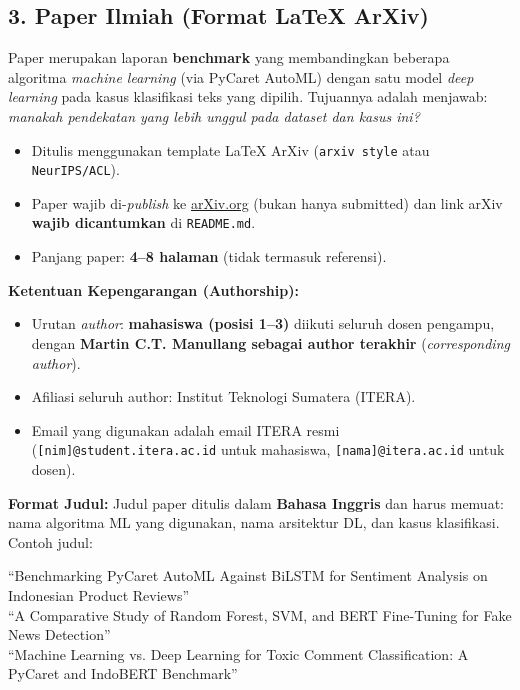 \documentclass[11pt,a4paper]{article}
\begin{document}
\subsection{3. Paper Ilmiah (Format LaTeX ArXiv)}

Paper merupakan laporan \textbf{benchmark} yang membandingkan beberapa algoritma \textit{machine learning} (via PyCaret AutoML) dengan satu model \textit{deep learning} pada kasus klasifikasi teks yang dipilih. Tujuannya adalah menjawab: \textit{manakah pendekatan yang lebih unggul pada dataset dan kasus ini?}

\begin{itemize}
  \item Ditulis menggunakan template LaTeX ArXiv (\texttt{arxiv style} atau \texttt{NeurIPS/ACL}).
  \item Paper wajib di-\textit{publish} ke \href{https://arxiv.org}{arXiv.org} (bukan hanya submitted) dan link arXiv \textbf{wajib dicantumkan} di \texttt{README.md}.
  \item Panjang paper: \textbf{4--8 halaman} (tidak termasuk referensi).
\end{itemize}

\textbf{Ketentuan Kepengarangan (Authorship):}
\begin{itemize}
  \item Urutan \textit{author}: \textbf{mahasiswa (posisi 1--3)} diikuti seluruh dosen pengampu, dengan \textbf{Martin C.T. Manullang sebagai author terakhir} (\textit{corresponding author}).
  \item Afiliasi seluruh author: Institut Teknologi Sumatera (ITERA).
  \item Email yang digunakan adalah email ITERA resmi (\texttt{[nim]@student.itera.ac.id} untuk mahasiswa, \texttt{[nama]@itera.ac.id} untuk dosen).
\end{itemize}

\textbf{Format Judul:} Judul paper ditulis dalam \textbf{Bahasa Inggris} dan harus memuat: nama algoritma ML yang digunakan, nama arsitektur DL, dan kasus klasifikasi. Contoh judul:

\begin{tcolorbox}[colback=lightgray,colframe=itera!40,fontupper=\small\itshape]
``Benchmarking PyCaret AutoML Against BiLSTM for Sentiment Analysis on Indonesian Product Reviews''\\[4pt]
``A Comparative Study of Random Forest, SVM, and BERT Fine-Tuning for Fake News Detection''\\[4pt]
``Machine Learning vs. Deep Learning for Toxic Comment Classification: A PyCaret and IndoBERT Benchmark''
\end{tcolorbox}
\end{document}
